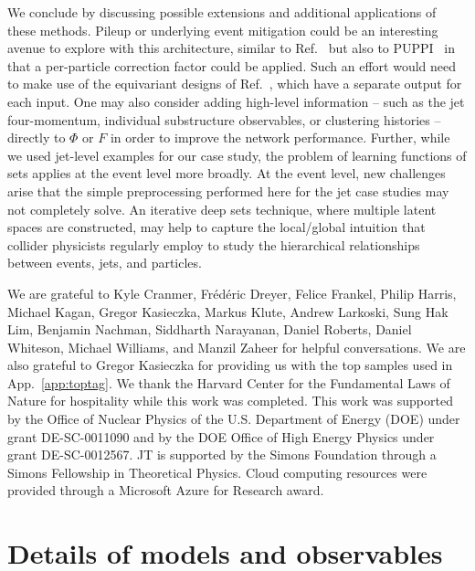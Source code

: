 \documentclass[letterpaper,11pt]{article}
\DeclareRobustCommand{\App}[1]{App.~\ref{#1}}
\DeclareRobustCommand{\Ref}[1]{Ref.~\cite{#1}}
\newcommand{\deepsets}{DBLP:conf/nips/ZaheerKRPSS17}
\begin{document}
We conclude by discussing possible extensions and additional applications of these methods.
%
Pileup or underlying event mitigation could be an interesting avenue to explore with this architecture, similar to \Ref{Komiske:2017ubm} but also to PUPPI~\cite{Bertolini:2014bba} in that a per-particle correction factor could be applied.
%
Such an effort would need to make use of the equivariant designs of \Ref{\deepsets}, which have a separate output for each input.
%
One may also consider adding high-level information -- such as the jet four-momentum, individual substructure observables, or clustering histories -- directly to $\Phi$ or $F$ in order to improve the network performance.
%
Further, while we used jet-level examples for our case study, the problem of learning functions of sets applies at the event level more broadly.
%
At the event level, new challenges arise that the simple preprocessing performed here for the jet case studies may not completely solve.
%
An iterative deep sets technique, where multiple latent spaces are constructed, may help to capture the local/global intuition that collider physicists regularly employ to study the hierarchical relationships between events, jets, and particles.


\acknowledgments

We are grateful to Kyle Cranmer, Fr\'{e}d\'{e}ric Dreyer, Felice Frankel, Philip Harris, Michael Kagan, Gregor Kasieczka, Markus Klute, Andrew Larkoski, Sung Hak Lim, Benjamin Nachman, Siddharth Narayanan, Daniel Roberts, Daniel Whiteson, Michael Williams, and Manzil Zaheer for helpful conversations.
%
We are also grateful to Gregor Kasieczka for providing us with the top samples used in \App{app:toptag}.
%
We thank the Harvard Center for the Fundamental Laws of Nature for hospitality while this work was completed.
%
This work was supported by the Office of Nuclear Physics of the U.S. Department of Energy (DOE) under grant DE-SC-0011090 and by the DOE Office of High Energy Physics under grant DE-SC-0012567.
%
JT is supported by the Simons Foundation through a Simons Fellowship in Theoretical Physics.
%
Cloud computing resources were provided through a Microsoft Azure for Research award.

\appendix


\section{Details of models and observables}
\label{app:models}
\end{document}
